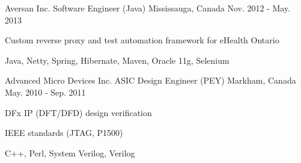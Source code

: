 \begin{cventries}
  \cventry
    {Aversan Inc.} %
    {Software Engineer (Java)} %
    {Mississauga, Canada} %
    {Nov. 2012 - May. 2013} %
    {
      \begin{cvitems} %
        \item {Custom reverse proxy and test automation framework for eHealth Ontario}
        \item {Java, Netty, Spring, Hibernate, Maven, Oracle 11g, Selenium}
      \end{cvitems}
    }

  \cventry
    {Advanced Micro Devices Inc.} %
    {ASIC Design Engineer (PEY)} %
    {Markham, Canada} %
    {May. 2010 - Sep. 2011} %
    {
      \begin{cvitems} %
        \item {DFx IP (DFT/DFD) design verification}
        \item {IEEE standards (JTAG, P1500)}
        \item {C++, Perl, System Verilog, Verilog}
      \end{cvitems}
    }

\end{cventries}
